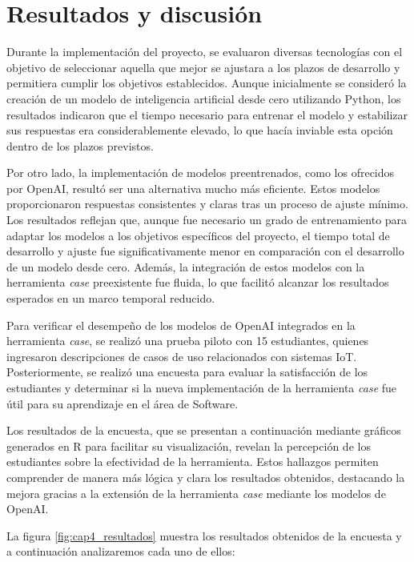 \chapter{Resultados y discusión}\label{chapter:resultados}

Durante la implementación del proyecto, se evaluaron diversas tecnologías con el objetivo de seleccionar aquella que mejor se ajustara a los plazos de desarrollo y permitiera cumplir los objetivos establecidos. Aunque inicialmente se consideró la creación de un modelo de inteligencia artificial desde cero utilizando Python, los resultados indicaron que el tiempo necesario para entrenar el modelo y estabilizar sus respuestas era considerablemente elevado, lo que hacía inviable esta opción dentro de los plazos previstos.

Por otro lado, la implementación de modelos preentrenados, como los ofrecidos por OpenAI, resultó ser una alternativa mucho más eficiente. Estos modelos proporcionaron respuestas consistentes y claras tras un proceso de ajuste mínimo. Los resultados reflejan que, aunque fue necesario un grado de entrenamiento para adaptar los modelos a los objetivos específicos del proyecto, el tiempo total de desarrollo y ajuste fue significativamente menor en comparación con el desarrollo de un modelo desde cero. Además, la integración de estos modelos con la herramienta \textit{case} preexistente fue fluida, lo que facilitó alcanzar los resultados esperados en un marco temporal reducido.

Para verificar el desempeño de los modelos de OpenAI integrados en la herramienta \textit{case}, se realizó una prueba piloto con 15 estudiantes, quienes ingresaron descripciones de casos de uso relacionados con sistemas IoT. Posteriormente, se realizó una encuesta para evaluar la satisfacción de los estudiantes y determinar si la nueva implementación de la herramienta \textit{case} fue útil para su aprendizaje en el área de Software.

Los resultados de la encuesta, que se presentan a continuación mediante gráficos generados en R para facilitar su visualización, revelan la percepción de los estudiantes sobre la efectividad de la herramienta. Estos hallazgos permiten comprender de manera más lógica y clara los resultados obtenidos, destacando la mejora gracias a la extensión de la herramienta \textit{case} mediante los modelos de OpenAI.

La figura \ref{fig:cap4_resultados} muestra los resultados obtenidos de la encuesta y a continuación analizaremos cada uno de ellos:

